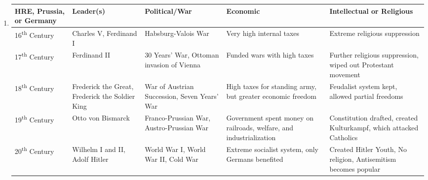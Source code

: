 \documentclass[12pt]{article}
\begin{document}
\begin{enumerate}
\begin{tabular}{p{} p{} p{} p{} p{}}
Portugal \& Spain & Leader(s) & Political/War & Economic & Intellectual or Religious \\
\hline
16\textsuperscript{th} Century & Ferdinand and Isabella & Reconquista and Inquisition & Extreme economic collapse following influx of precious metals from the Americas & ``Cleansed'' their land of the Jewish and Muslim people \\
\hline
17\textsuperscript{th} Century & Charles II, Phillip IV & 30 Years' War, War of Devolution, Dutch Revolt  & More inflation, and further competition from the Dutch economy & Military begins to fall apart  \\
\hline
18\textsuperscript{th} Century & Phillip V, Ferdinand VI & War of Austrian Succession, French and Indian War & Lost overseas colonies & Catholic Extremism leads to religious suppression \\
\hline
19\textsuperscript{th} Century & Alfonso XII and XIII & Franco-Prussian War & Established a currency, valued at roughly 10 USD modern day & Conservative leaders try to prevent any nationalistic or liberal insurgence \\
\hline
20\textsuperscript{th} Century & Fascist Francisco Franco & Spanish Civil War, a little World War II, and Cold War & State-owned industries & Extreme censorship, no democracy \\

\end{tabular}

\item \begin{tabular}{p{} p{} p{} p{} p{}}

HRE, Prussia, or Germany & Leader(s) & Political/War & Economic & Intellectual or Religious \\
\hline
16\textsuperscript{th} Century & Charles V, Ferdinand I & Habsburg-Valois War & Very high internal taxes & Extreme religious suppression  \\
\hline
17\textsuperscript{th} Century & Ferdinand II & 30 Years' War, Ottoman invasion of Vienna & Funded wars with high taxes & Further religious suppression, wiped out Protestant movement \\
\hline
18\textsuperscript{th} Century & Frederick the Great, Frederick the Soldier King & War of Austrian Succession, Seven Years' War & High taxes for standing army, but greater economic freedom & Feudalist system kept, allowed partial freedoms  \\
\hline
19\textsuperscript{th} Century & Otto von Bismarck & Franco-Prussian War, Austro-Prussian War  & Government spent money on railroads, welfare, and industrialization & Constitution drafted, created Kulturkampf, which attacked Catholics \\
\hline
20\textsuperscript{th} Century & Wilhelm I and II, Adolf Hitler & World War I, World War II, Cold War & Extreme socialist system, only Germans benefited & Created Hitler Youth, No religion, Antisemitism becomes popular  \\


\end{tabular}
\end{enumerate}
\end{document}
